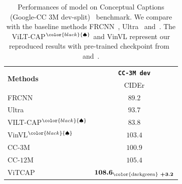 \begin{table}[t!]
\centering
\renewcommand{\arraystretch}{1.05} %
\caption[Performances of \vitcapp model on Conceptual Captions (Google-CC 3M dev-split)~\citep{sharma2018conceptual} benchmark.]{\small
Performances of \vitcapp model on Conceptual Captions (Google-CC 3M dev-split)~\citep{sharma2018conceptual} benchmark. We compare with the baseline methods FRCNN~\citep{changpinyo2019decoupled}, Ultra~\citep{changpinyo2019decoupled} and~\citep{changpinyo2021conceptual}. The ViLT-CAP$^{\color{black}{\spadesuit}}$ and VinVL represent our reproduced results with pre-trained checkpoint from~\citep{kim2021vilt} and~\citep{zhang2021multi}.
}
\scalebox{0.99}
{ 
\small
\begin{tabular}{l|c}
\toprule
\multirow{2}{*}{\textbf{Methods}}  & \multicolumn{1}{c}{{ \texttt{\textbf{CC-3M dev}}}}  \\ 
& {CIDEr} \\
\hline 
   \cellcolor{red!3}FRCNN & $89.2$ \\
   \cellcolor{red!3}Ultra & $93.7$ \\ 
   \cellcolor{red!3}VILT-CAP$^{\color{black}{\spadesuit}}$ & $83.8$\\ 
   \cellcolor{red!3}VinVL$^{\color{black}{\spadesuit}}$ & $103.4$ \\ 
   \cellcolor{red!3}CC-$3$M & $100.9$ \\
   \cellcolor{red!3}CC-$12$M & $105.4$ \\ 
   \hline
   \cellcolor{blue!3}ViTCAP  &  $\textbf{108.6}_\text{\color{darkgreen}\textbf{ +3.2}}$ \\
\bottomrule
\end{tabular}
}
\label{tab:googlecc}
\end{table}


